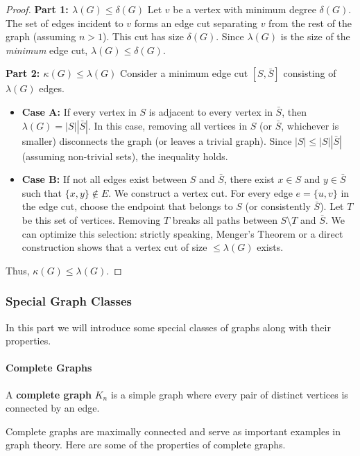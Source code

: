 \documentclass[oneside]{book}
\begin{document}
\begin{proof}
\textbf{Part 1: $\lambda(G) \le \delta(G)$}
Let $v$ be a vertex with minimum degree $\delta(G)$. The set of edges incident to $v$ forms an edge cut separating $v$ from the rest of the graph (assuming $n > 1$). This cut has size $\delta(G)$. Since $\lambda(G)$ is the size of the \textit{minimum} edge cut, $\lambda(G) \le \delta(G)$.

\textbf{Part 2: $\kappa(G) \le \lambda(G)$}
Consider a minimum edge cut $[S, \bar{S}]$ consisting of $\lambda(G)$ edges.
\begin{itemize}
    \item \textbf{Case A:} If every vertex in $S$ is adjacent to every vertex in $\bar{S}$, then $\lambda(G) = |S||\bar{S}|$. In this case, removing all vertices in $S$ (or $\bar{S}$, whichever is smaller) disconnects the graph (or leaves a trivial graph). Since $|S| \le |S||\bar{S}|$ (assuming non-trivial sets), the inequality holds.
    \item \textbf{Case B:} If not all edges exist between $S$ and $\bar{S}$, there exist $x \in S$ and $y \in \bar{S}$ such that $\{x, y\} \notin E$. We construct a vertex cut. For every edge $e = \{u, v\}$ in the edge cut, choose the endpoint that belongs to $S$ (or consistently $\bar{S}$). Let $T$ be this set of vertices. Removing $T$ breaks all paths between $S \setminus T$ and $\bar{S}$. We can optimize this selection: strictly speaking, Menger's Theorem or a direct construction shows that a vertex cut of size $\le \lambda(G)$ exists.
\end{itemize}
Thus, $\kappa(G) \le \lambda(G)$.
\end{proof}

\subsubsection{Special Graph Classes}

In this part we will introduce some special classes of graphs along with their properties.

\paragraph{Complete Graphs}
\begin{definition}
A \textbf{complete graph} $K_n$ is a simple graph where every pair of distinct vertices is connected by an edge.
\end{definition}

Complete graphs are maximally connected and serve as important examples in graph theory. Here are some of the properties of complete graphs.
\end{document}
